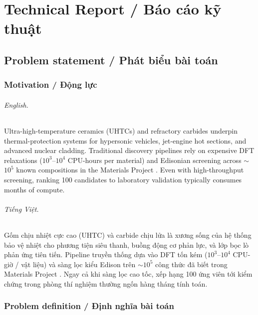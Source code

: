 \documentclass[11pt,a4paper]{report}
\begin{document}
\part{Technical Report / Báo cáo kỹ thuật}

\chapter{Problem statement / Phát biểu bài toán}

\section{Motivation / Động lực}

\paragraph{English.}
Ultra-high-temperature ceramics (UHTCs) and refractory carbides underpin thermal-protection
systems for hypersonic vehicles, jet-engine hot sections, and advanced nuclear cladding.
Traditional discovery pipelines rely on expensive DFT relaxations ($10^3$--$10^4$ CPU-hours
per material) and Edisonian screening across $\sim$$10^5$ known compositions in the Materials
Project \cite{jain2013mp}. Even with high-throughput screening, ranking 100 candidates to
laboratory validation typically consumes months of compute.

\paragraph{Tiếng Việt.}
Gốm chịu nhiệt cực cao (UHTC) và carbide chịu lửa là xương sống của hệ thống bảo vệ nhiệt
cho phương tiện siêu thanh, buồng động cơ phản lực, và lớp bọc lò phản ứng tiên tiến.
Pipeline truyền thống dựa vào DFT tốn kém ($10^3$--$10^4$ CPU-giờ / vật liệu) và sàng lọc
kiểu Edison trên $\sim$$10^5$ công thức đã biết trong Materials Project \cite{jain2013mp}.
Ngay cả khi sàng lọc cao tốc, xếp hạng 100 ứng viên tới kiểm chứng trong phòng thí nghiệm
thường ngốn hàng tháng tính toán.

\section{Problem definition / Định nghĩa bài toán}
\end{document}
